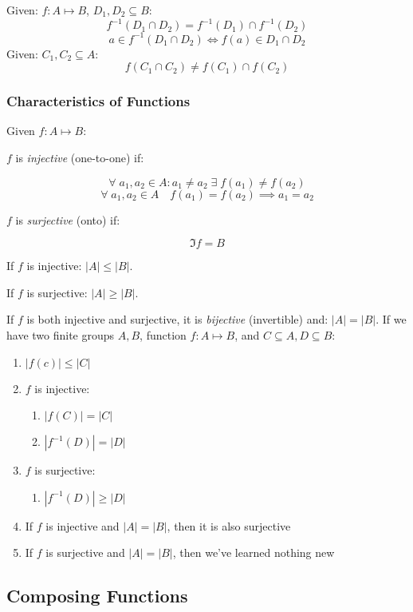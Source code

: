\documentclass[00_complete]{subfiles}
\begin{document}
\begin{claim}
Given: $f: A \mapsto B$, $D_1, D_2 \subseteq B$:
$$f^{-1}(D_1 \cap D_2) = f^{-1}(D_1) \cap f^{-1}(D_2)$$
$$a \in f^{-1}(D_1 \cap D_2) \iff f(a) \in D_1 \cap D_2$$
Given: $C_1, C_2 \subseteq A$:
$$f(C_1 \cap C_2) \neq f(C_1) \cap f(C_2)$$
\end{claim}

\subsubsection{Characteristics of Functions}
Given $f: A \mapsto B$:

$f$ is \emph{injective} (one-to-one) if:

$$\forall \; a_1,a_2 \in A : a_1 \neq a_2 \; \exists \; f(a_1) \neq f(a_2)$$
$$\forall \; a_1,a_2 \in A \quad f(a_1) = f(a_2) \implies a_1 = a_2$$

$f$ is \emph{surjective} (onto) if:

$$\Im f = B$$

If $f$ is injective: $|A| \leq |B|$.

If $f$ is surjective: $|A| \geq |B|$.

If $f$ is both injective and surjective, it is \emph{bijective} (invertible) and: $|A| = |B|$.
If we have two finite groups $A, B$, function $f: A \mapsto B$, and $C
\subseteq A, D \subseteq B$:
\begin{enumerate}
    \item $|f(c)| \leq |C|$
    \item $f$ is injective:
     \begin{enumerate}
        \item $|f(C)|= |C|$
        \item $|f^{-1}(D)| = |D|$
     \end{enumerate}
    \item $f$ is surjective:
    \begin{enumerate}
        \item $|f^{-1}(D)| \geq |D|$
    \end{enumerate}
    \item If $f$ is injective and $|A|=|B|$, then it is also surjective
    \item If $f$ is surjective and $|A|=|B|$, then we've learned nothing new
\end{enumerate}

\subsection{Composing Functions}
\end{document}
